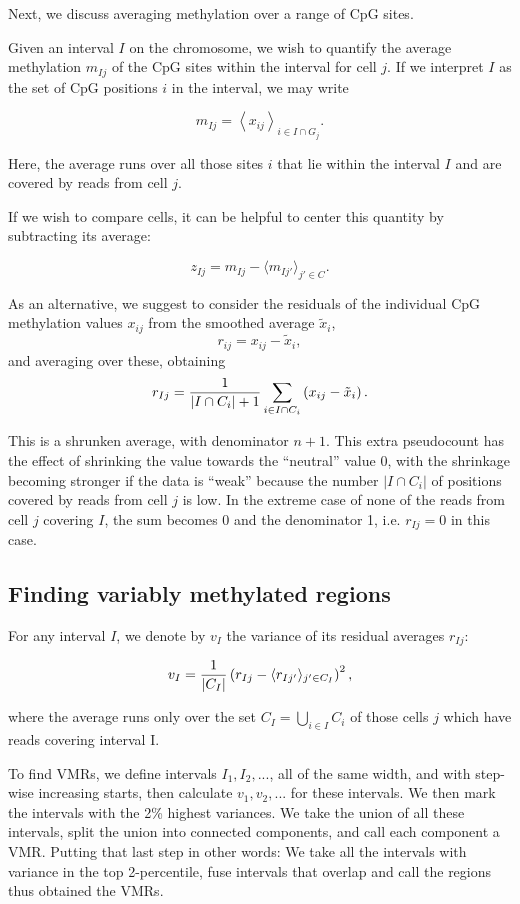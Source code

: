 \documentclass[twocolumn,10pt]{article}
\begin{document}
Next, we discuss averaging methylation over a range of CpG sites.

Given an interval $I$ on the chromosome, we wish to quantify the average methylation $m_{Ij}$ of the CpG sites within the interval for cell $j$.
If we interpret $I$ as the set of CpG positions $i$ in the interval, we may write

$$ m_{Ij} = \left< x_{ij} \right>_{i\in I\cap G_j}.$$

Here, the average runs over all those sites $i$ that lie within the interval $I$ and are covered by reads from cell $j$.

If we wish to compare cells, it can be helpful to center this quantity by subtracting its average:

$$ z_{Ij} = m_{Ij} - \langle m_{Ij'}\rangle_{j'\in C}.$$

As an alternative, we suggest to consider the residuals of the individual CpG methylation values $x_{ij}$ from the smoothed average $\tilde x_i$,
$$ r_{ij} = x_{ij} - \tilde x_i, $$
and averaging over these, obtaining
\begin{equation} 
r_{Ij} = \frac{\scriptsize{1}}{\scriptsize{|I\cap C_i|+1}}\sum_{i\in I\cap C_i}\left( x_{ij} - \tilde x_i \right).
\label{avgres}
\end{equation}

This is a shrunken average, with denominator $n+1$.
This extra pseudocount has the effect of shrinking the value towards the ``neutral'' value 0, with the shrinkage becoming stronger if the data is ``weak'' because the number $|I\cap C_i|$ of positions covered by reads from cell $j$  is low.
In the extreme case of none of the reads from cell $j$ covering $I$, the sum becomes 0 and the denominator 1, i.e.
$r_{Ij}=0$ in this case.

\subsection{Finding variably methylated regions}

For any interval $I$, we denote by $v_I$ the variance of its residual averages $r_{Ij}$:

$$ v_I = \frac{\scriptsize{1}}{\scriptsize{|C_I|}}\left( r_{Ij} - \langle r_{Ij'}\rangle_{j'\in C_I} \right)^2,$$

where the average runs only over the set $C_I=\bigcup_{i\in I}C_i$ of those cells $j$ which have reads covering interval I.

To find VMRs, we define intervals $I_1, I_2, ...$, all of the same width, and with step-wise increasing starts, then calculate $v_1, v_2, ...$ for these intervals.
We then mark the intervals with the 2\% highest variances.
We take the union of all these intervals, split the union into connected components, and call each component a VMR.
Putting that last step in other words: We take all the intervals with variance in the top 2-percentile, fuse intervals that overlap and call the regions thus obtained the VMRs.
\end{document}
